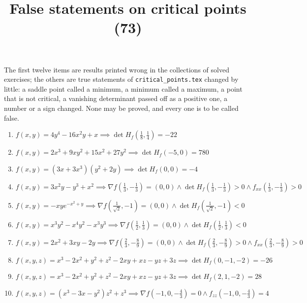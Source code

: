\documentclass[11pt,a4paper]{article}
\title{False statements on critical points (73)}
\author{}
\date{}
\begin{document}
\maketitle
The first twelve items are results printed wrong in the collections of solved exercises; the others are true statements of \texttt{critical\_points.tex} changed by little: a saddle point called a minimum, a minimum called a maximum, a point that is not critical, a vanishing determinant passed off as a positive one, a number or a sign changed. None may be proved, and every one is to be called false.

\begin{enumerate}
\item $\displaystyle f(x, y) = 4y^{4} - 16x^{2} y + x \implies \det H_{f}\left( \frac{1}{8}, \frac{1}{4} \right) = -22$
\item $\displaystyle f(x, y) = 2x^{3} + 9x y^{2} + 15x^{2} + 27y^{2} \implies \det H_{f}(-5, 0) = 780$
\item $\displaystyle f(x, y) = (3x + 3x^{3})(y^{2} + 2y) \implies \det H_{f}(0, 0) = -4$
\item $\displaystyle f(x, y) = 3x^{2} y - y^{3} + x^{2} \implies \nabla f\left( \frac{1}{3}, -\frac{1}{3} \right) = (0, 0) \land \det H_{f}\left( \frac{1}{3}, -\frac{1}{3} \right) > 0 \land f_{xx}\left( \frac{1}{3}, -\frac{1}{3} \right) > 0$
\item $\displaystyle f(x, y) = -xy e^{-x^{2} + y} \implies \nabla f\left( \frac{1}{\sqrt{2}}, -1 \right) = (0, 0) \land \det H_{f}\left( \frac{1}{\sqrt{2}}, -1 \right) < 0$
\item $\displaystyle f(x, y) = x^{3} y^{2} - x^{4} y^{2} - x^{3} y^{3} \implies \nabla f\left( \frac{1}{2}, \frac{1}{3} \right) = (0, 0) \land \det H_{f}\left( \frac{1}{2}, \frac{1}{3} \right) < 0$
\item $\displaystyle f(x, y) = 2x^{2} + 3xy - 2y \implies \nabla f\left( \frac{2}{3}, -\frac{8}{9} \right) = (0, 0) \land \det H_{f}\left( \frac{2}{3}, -\frac{8}{9} \right) > 0 \land f_{xx}\left( \frac{2}{3}, -\frac{8}{9} \right) > 0$
\item $\displaystyle f(x, y, z) = x^{3} - 2x^{2} + y^{2} + z^{2} - 2xy + xz - yz + 3z \implies \det H_{f}(0, -1, -2) = -26$
\item $\displaystyle f(x, y, z) = x^{3} - 2x^{2} + y^{2} + z^{2} - 2xy + xz - yz + 3z \implies \det H_{f}(2, 1, -2) = 28$
\item $\displaystyle f(x, y, z) = (x^{3} - 3x - y^{2}) z^{2} + z^{3} \implies \nabla f\left( -1, 0, -\frac{4}{3} \right) = 0 \land f_{zz}\left( -1, 0, -\frac{4}{3} \right) = 4$

\end{enumerate}
\end{document}
